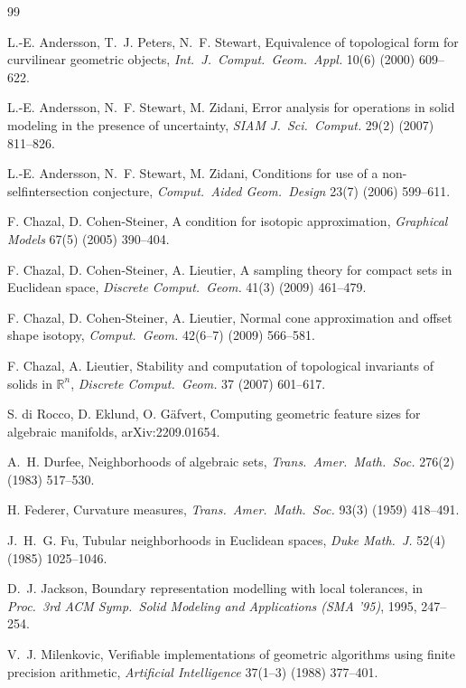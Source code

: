 \documentclass[preprint,12pt]{elsarticle}
\theoremstyle{definition}
\theoremstyle{remark}
\begin{document}
\begin{thebibliography}{99}

 L.-E. Andersson, T.~J. Peters, N.~F. Stewart, Equivalence of topological form for curvilinear
geometric objects, \emph{Int.\ J.\ Comput.\ Geom.\ Appl.} 10(6) (2000) 609--622.

 L.-E. Andersson, N.~F. Stewart, M. Zidani, Error analysis for operations in solid modeling in the
presence of uncertainty, \emph{SIAM J.\ Sci.\ Comput.} 29(2) (2007) 811--826.

 L.-E. Andersson, N.~F. Stewart, M. Zidani, Conditions for use of a non-selfintersection conjecture,
\emph{Comput.\ Aided Geom.\ Design} 23(7) (2006) 599--611.

 F. Chazal, D. Cohen-Steiner, A condition for isotopic approximation, \emph{Graphical Models} 67(5)
(2005) 390--404.

 F. Chazal, D. Cohen-Steiner, A. Lieutier, A sampling theory for compact sets in Euclidean space,
\emph{Discrete Comput.\ Geom.} 41(3) (2009) 461--479.

 F. Chazal, D. Cohen-Steiner, A. Lieutier, Normal cone approximation and offset shape isotopy,
\emph{Comput.\ Geom.} 42(6--7) (2009) 566--581.

 F. Chazal, A. Lieutier, Stability and computation of topological invariants of solids
in $\mathbb R^n$, \emph{Discrete Comput.\ Geom.} 37 (2007) 601--617.

 S. di Rocco, D. Eklund, O. Gäfvert, Computing geometric feature sizes for algebraic manifolds,
arXiv:2209.01654.

 A.~H. Durfee, Neighborhoods of algebraic sets, \emph{Trans.\ Amer.\ Math.\ Soc.} 276(2) (1983) 517--530.

 H. Federer, Curvature measures, \emph{Trans.\ Amer.\ Math.\ Soc.} 93(3) (1959) 418--491.

 J.~H.~G. Fu, Tubular neighborhoods in Euclidean spaces, \emph{Duke Math.\ J.} 52(4) (1985) 1025--1046.

 D.~J. Jackson, Boundary representation modelling with local tolerances, in \emph{Proc.\ 3rd ACM
Symp.\ Solid Modeling and Applications (SMA '95)}, 1995, 247--254.

 V.~J. Milenkovic, Verifiable implementations of geometric algorithms using finite precision
arithmetic, \emph{Artificial Intelligence} 37(1--3) (1988) 377--401.



\end{thebibliography}
\end{document}
